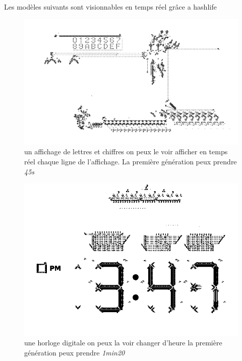 Les modèles suivants sont visionnables en temps réel grâce a hashlife

\begin{figure}[H]
        \center
        \includegraphics[scale=0.3]{images/imgHashlife/display.png}
        \caption{un affichage de lettres et chiffres on peux le voir afficher en temps réel chaque ligne de l'affichage. La première génération peux prendre \textit{45s}}
\end{figure}

\begin{figure}[H]
        \center
        \includegraphics[scale=0.3]{images/imgHashlife/clock.png}
        \caption{une horloge digitale on peux la voir changer d'heure la première génération peux prendre \textit{1min20}}
\end{figure}


